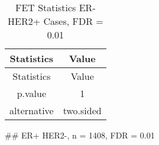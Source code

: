 \documentclass[]{article}
\begin{document}
\begin{longtable}[]{@{}cc@{}}
\caption{FET Statistics ER- HER2+ Cases, FDR = 0.01}\tabularnewline
\toprule
\begin{minipage}[b]{0.18\columnwidth}\centering\strut
Statistics\strut
\end{minipage} & \begin{minipage}[b]{0.14\columnwidth}\centering\strut
Value\strut
\end{minipage}\tabularnewline
\midrule
\endfirsthead
\toprule
\begin{minipage}[b]{0.18\columnwidth}\centering\strut
Statistics\strut
\end{minipage} & \begin{minipage}[b]{0.14\columnwidth}\centering\strut
Value\strut
\end{minipage}\tabularnewline
\midrule
\endhead
\begin{minipage}[t]{0.18\columnwidth}\centering\strut
p.value\strut
\end{minipage} & \begin{minipage}[t]{0.14\columnwidth}\centering\strut
1\strut
\end{minipage}\tabularnewline
\begin{minipage}[t]{0.18\columnwidth}\centering\strut
alternative\strut
\end{minipage} & \begin{minipage}[t]{0.14\columnwidth}\centering\strut
two.sided\strut
\end{minipage}\tabularnewline
\bottomrule
\end{longtable}

\pagebreak
\#\# ER+ HER2-, n = 1408, FDR = 0.01
\end{document}
